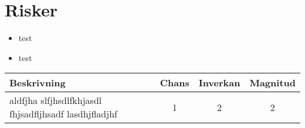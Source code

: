 \section{Risker}

\begin{itemize}
    \item test
    \item test
\end{itemize}

\begin{center}
    \begin{tabular}{| p{3cm} |  c | c |c | }
        \hline
        Beskrivning &  Chans &  Inverkan & Magnitud \\
        \hline
        \centering aldfjha slfjhsdlfkhjasdl fhjsadfljhsadf lasdhjfladjhf & 1 & 2 & 2\\
        \hline        
    \end{tabular}
\end{center}
